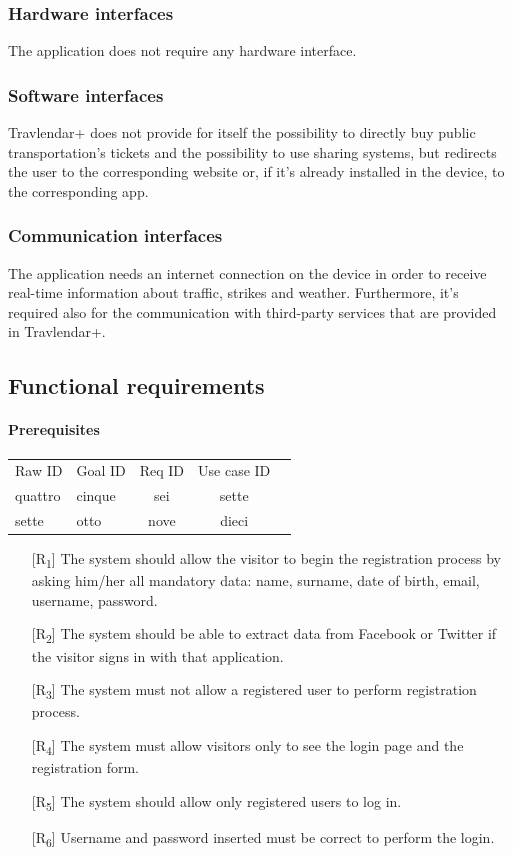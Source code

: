 \documentclass[12pt,titlepage]{article}
\begin{document}
\subsubsection{Hardware interfaces}\label{sec:mod1}
The application does not require any hardware interface. 

\subsubsection{Software interfaces}\label{sec:mod1}
Travlendar+ does not provide for itself the possibility to directly buy public transportation's tickets and the possibility to use sharing systems, but redirects the user to the corresponding website or, if it's already installed in the device, to the corresponding app.

\subsubsection{Communication interfaces}\label{sec:mod1}
The application needs an internet connection on the device in order to receive real-time information about traffic, strikes and weather. Furthermore, it's required also for the communication with third-party services that are provided in Travlendar+. 

\subsection{Functional requirements}\label{sec:mod1}
\paragraph{Prerequisites}
\begin{tabular}{llccr}
\rowcolor{red}
 Raw ID & Goal ID & Req ID & Use case ID \\
\rowcolor{lightgray}
 quattro & cinque & sei & sette \\
\rowcolor{anti-flashwhite}
sette & otto & nove & dieci 
\end{tabular}

\begin{itemize}
\item[{[R\textsubscript{1}]}] The system should allow the visitor to begin the registration process by asking him/her all mandatory data: name, surname, date of birth, email, username, password.
\item[{[R\textsubscript{2}]}] The system should be able to extract data from Facebook or Twitter if the visitor signs in with that application.
\item[{[R\textsubscript{3}]}] The system must not allow a registered user to perform registration process.
\item[{[R\textsubscript{4}]}] The system must allow visitors only to see the login page and the registration form.
\item[{[R\textsubscript{5}]}] The system should allow only registered users to log in.
\item[{[R\textsubscript{6}]}] Username and password inserted must be correct to perform the login.
\end{itemize}
\end{document}
